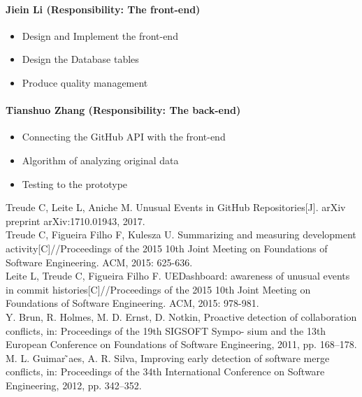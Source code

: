 \documentclass[conference]{IEEEtran}
\begin{document}
\paragraph{\textbf{Jiein Li (Responsibility: The front-end)}}
\medskip
\begin{itemize}
\item Design and Implement the front-end
\item Design the Database tables
\item Produce quality management
\end{itemize}
\bigskip

\paragraph{\textbf{Tianshuo Zhang (Responsibility: The back-end)}}
\medskip
\begin{itemize}
\item Connecting the GitHub API with the front-end
\item Algorithm of analyzing original data
\item Testing to the prototype
\end{itemize}


\begin{thebibliography}{99}

 Treude C, Leite L, Aniche M. Unusual Events in GitHub Repositories[J]. arXiv preprint arXiv:1710.01943, 2017.\\

 Treude C, Figueira Filho F, Kulesza U. Summarizing and measuring development activity[C]//Proceedings of the 2015 10th Joint Meeting on Foundations of Software Engineering. ACM, 2015: 625-636.\\

 Leite L, Treude C, Figueira Filho F. UEDashboard: awareness of unusual events in commit histories[C]//Proceedings of the 2015 10th Joint Meeting on Foundations of Software Engineering. ACM, 2015: 978-981.\\

 Y. Brun, R. Holmes, M. D. Ernst, D. Notkin, Proactive detection of collaboration conflicts, in: Proceedings of the 19th SIGSOFT Sympo- sium and the 13th European Conference on Foundations of Software Engineering, 2011, pp. 168–178. 
 M. L. Guimar ̃aes, A. R. Silva, Improving early detection of software merge conflicts, in: Proceedings of the 34th International Conference on Software Engineering, 2012, pp. 342–352. 


\end{thebibliography}
\end{document}
